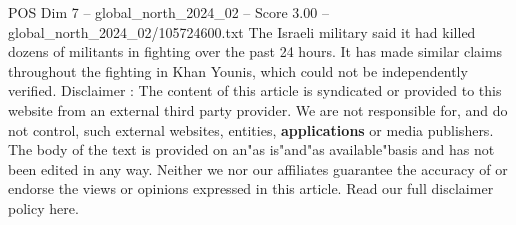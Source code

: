 \begin{textsample}{POS Dim 7 – global\_north\_2024\_02 – Score 3.00 – global\_north\_2024\_02/105724600.txt}
The Israeli military said it had killed dozens of militants in fighting over the past 24 hours.
It has made similar claims throughout the fighting in Khan Younis, which could not be independently verified.
Disclaimer : The content of this article is syndicated or provided to this website from an external third party provider.
We are not responsible for, and do not control, such external websites, entities, \textbf{applications} or media publishers.
The body of the text is provided on an"as is"and"as available"basis and has not been edited in any way.
Neither we nor our affiliates guarantee the accuracy of or endorse the views or opinions expressed in this article.
Read our full disclaimer policy here.

\end{textsample}
